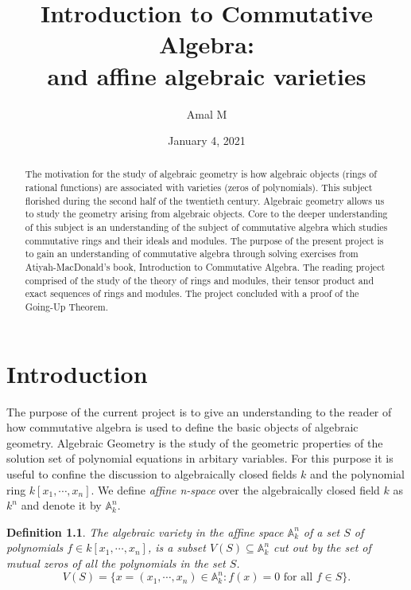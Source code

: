 \documentclass[]{report}
\newtheorem{defn}[theorem]{Definition}
\begin{document}
\title{%
    Introduction to Commutative Algebra: \\
    
    \large and affine algebraic varieties}
\author{Amal M}
\date{January 4, 2021}
\maketitle

\begin{abstract}

    The motivation for the study of algebraic geometry is how algebraic objects (rings of rational functions) are associated with varieties (zeros of polynomials). This subject florished during the second half of the twentieth century. Algebraic geometry allows us to study the geometry arising from algebraic objects. Core to the deeper understanding of this subject is an understanding of the subject of commutative algebra which studies commutative rings and their ideals and modules. The purpose of the present project is to gain an understanding of commutative algebra through solving exercises from Atiyah-MacDonald's book, Introduction to Commutative Algebra. The reading project comprised of the study of the theory of rings and modules, their tensor product and exact sequences of rings and modules. The project concluded with a proof of the Going-Up Theorem.

\end{abstract}

\tableofcontents
\newpage

\chapter{Introduction}

The purpose of the current project is to give an understanding 
to the reader of how commutative algebra is used to define the basic
objects of algebraic geometry. Algebraic Geometry is the study of
the geometric properties of the solution set of polynomial equations
in arbitary variables. For this purpose it is useful to confine the 
discussion to algebraically closed fields $k$ and the polynomial ring
$k[x_1,\cdots,x_n]$. We define \textit{affine n-space} over the algebraically closed field $k$ as $k^n$ and denote it by $\mathbb{A}^n_k$.

\begin{defn} The algebraic variety \cite{vakil145} in the affine space $\mathbb{A}^n_k$ of a set $S$ of polynomials $f\in k[x_1,\cdots, x_n]$, is a subset $V(S)\subseteq \mathbb{A}^n_k$ cut out by the set of mutual zeros of all the polynomials in the set $S$.  
    $$V(S) = \{x = (x_1,\cdots,x_n) \in \mathbb{A}^n_k : f(x) = 0 \text{ for all } f \in S\}.$$
\end{defn}
\end{document}
